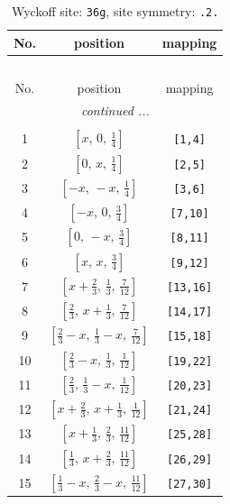 \documentclass[fleqn,8pt]{jsarticle}
\begin{document}
\begin{longtable}{ccc}
\caption{Wyckoff site: {\tt 36g}, site symmetry: {\tt .2.}}
 \\
 \hline \hline
No. & position & mapping \\ \hline \endfirsthead

\multicolumn{2}{l}{\tablename\ \thetable{}} \\
 \hline \hline
No. & position & mapping \\ \hline \endhead

 \hline \hline
\multicolumn{2}{r}{\footnotesize\it continued ...} \\ \endfoot

 \hline \hline
\multicolumn{2}{r}{} \\ \endlastfoot

1 & $\left[ x,\, 0,\, \frac{1}{4} \right]$ & {\tt [1,4]} \\ \hline
2 & $\left[ 0,\, x,\, \frac{1}{4} \right]$ & {\tt [2,5]} \\ \hline
3 & $\left[ - x,\, - x,\, \frac{1}{4} \right]$ & {\tt [3,6]} \\ \hline
4 & $\left[ - x,\, 0,\, \frac{3}{4} \right]$ & {\tt [7,10]} \\ \hline
5 & $\left[ 0,\, - x,\, \frac{3}{4} \right]$ & {\tt [8,11]} \\ \hline
6 & $\left[ x,\, x,\, \frac{3}{4} \right]$ & {\tt [9,12]} \\ \hline
7 & $\left[ x + \frac{2}{3},\, \frac{1}{3},\, \frac{7}{12} \right]$ & {\tt [13,16]} \\ \hline
8 & $\left[ \frac{2}{3},\, x + \frac{1}{3},\, \frac{7}{12} \right]$ & {\tt [14,17]} \\ \hline
9 & $\left[ \frac{2}{3} - x,\, \frac{1}{3} - x,\, \frac{7}{12} \right]$ & {\tt [15,18]} \\ \hline
10 & $\left[ \frac{2}{3} - x,\, \frac{1}{3},\, \frac{1}{12} \right]$ & {\tt [19,22]} \\ \hline
11 & $\left[ \frac{2}{3},\, \frac{1}{3} - x,\, \frac{1}{12} \right]$ & {\tt [20,23]} \\ \hline
12 & $\left[ x + \frac{2}{3},\, x + \frac{1}{3},\, \frac{1}{12} \right]$ & {\tt [21,24]} \\ \hline
13 & $\left[ x + \frac{1}{3},\, \frac{2}{3},\, \frac{11}{12} \right]$ & {\tt [25,28]} \\ \hline
14 & $\left[ \frac{1}{3},\, x + \frac{2}{3},\, \frac{11}{12} \right]$ & {\tt [26,29]} \\ \hline
15 & $\left[ \frac{1}{3} - x,\, \frac{2}{3} - x,\, \frac{11}{12} \right]$ & {\tt [27,30]} \\ \hline

\end{longtable}
\end{document}
